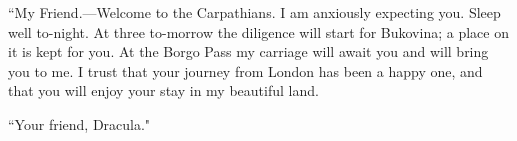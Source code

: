 ``My Friend.---Welcome to the Carpathians. I am anxiously expecting you. Sleep well to-night. At three to-morrow the diligence will start for Bukovina; a place on it is kept for you. At the Borgo Pass my carriage will await you and will bring you to me. I trust that your journey from London has been a happy one, and that you will enjoy your stay in my beautiful land.

``Your friend, Dracula."
